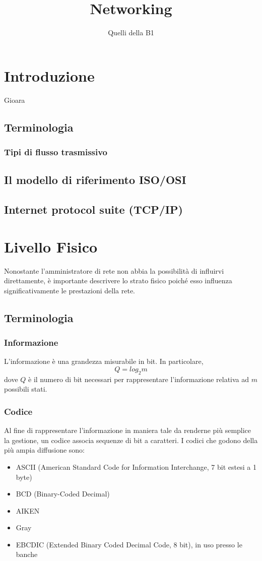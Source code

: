 \documentclass[a4paper,11pt]{paper}
\author{Quelli della B1}
\title{Networking}
\begin{document}
\maketitle
\newpage
\tableofcontents
\newpage

\section{Introduzione}
Gioara
\subsection{Terminologia}
\subsubsection{Tipi di flusso trasmissivo} 
\subsection{Il modello di riferimento ISO/OSI}
\subsection{Internet protocol suite (TCP/IP)}

\newpage

\section{Livello Fisico}
Nonostante l'amministratore di rete non abbia la possibilità di influirvi direttamente, è importante descrivere lo strato fisico poiché esso influenza significativamente le prestazioni della rete.

\subsection{Terminologia}
\subsubsection{Informazione} 
L'informazione è una grandezza misurabile in bit. In particolare, \[Q=log_{2}m\] dove $Q$ è il numero di bit necessari per rappresentare l'informazione relativa ad $m$ possibili stati. 

\subsubsection{Codice}
Al fine di rappresentare l'informazione in maniera tale da renderne più semplice la gestione, un codice associa sequenze di bit a caratteri. I codici che godono della più ampia diffusione sono:
\begin{itemize}
\item ASCII (American Standard Code for Information Interchange, 7 bit estesi a 1 byte)
\item BCD (Binary-Coded Decimal)
\item AIKEN 
\item Gray
\item EBCDIC (Extended Binary Coded Decimal Code, 8 bit), in uso presso le banche
\end{itemize}
\end{document}
